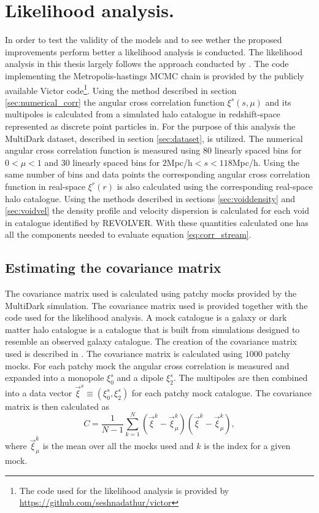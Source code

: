 \section{Likelihood analysis.}\label{sec:maximum_likelihood_method}
In order to test the validity of the models and to see wether the proposed improvements perform better a likelihood analysis is conducted. The likelihood analysis in this thesis largely follows the approach conducted by \cite{BeyondBAO}. The code implementing the Metropolis-hastings MCMC chain is provided by the publicly available Victor code\footnote{The code used for the likelihood analysis is provided by \url{https://github.com/seshnadathur/victor}}. Using the method described in section \ref{sec:numerical_corr} the angular cross correlation function $\xi^s(s,\mu)$ and its multipoles is calculated from a simulated halo catalogue in redshift-space represented as discrete point particles in. For the purpose of this analysis the MultiDark dataset, described in section \ref{sec:dataset}, is utilized. The numerical angular cross correlation function  is measured using $80$ linearly spaced bins for $0<\mu<1$ and $30$ linearly spaced bins for $2$Mpc/h$<s<118$Mpc/h. Using the same number of bins and data points the corresponding angular cross correlation function in real-space $\xi^r(r)$ is also calculated using the corresponding real-space halo catalogue. Using the methods described in sections \ref{sec:voiddensity} and \ref{sec:voidvel} the density profile and velocity dispersion is calculated for each void in catalogue identified by REVOLVER. With these quantities calculated one has all the components needed to evaluate equation \ref{eq:corr_stream}.
\subsection{Estimating the covariance matrix}
The covariance matrix used is calculated using patchy mocks provided by the MultiDark simulation\cite{MDmock1}\cite{MDmock2}. The covariance matrix used is provided together with the code used for the likelihood analysis. A mock catalogue is a galaxy or dark matter halo catalogue is a catalogue that is built from simulations designed to resemble an observed galaxy catalogue. The creation of the covariance matrix used is described in \cite{BeyondBAO}. The covariance matrix is calculated using $1000$ patchy mocks. For each patchy mock the angular cross correlation is measured and expanded into a monopole $\xi_0^s$ and a dipole $\xi_2^s$. The multipoles are then combined into a data vector $\vec{\xi}^s\equiv(\xi_0^s, \xi_2^s)$ for each patchy mock catalogue. The covariance matrix is then calculated as
\begin{equation}
    C=\frac{1}{N-1}\sum_{k=1}^N(\vec{\xi} ^k-\vec{\xi}^k_\mu)(\vec{\xi}^k-\vec{\xi}^k_\mu),
\end{equation} 
where $\vec{\xi}^k_\mu$ is the mean over all the mocks used and $k$ is the index for a given mock.
